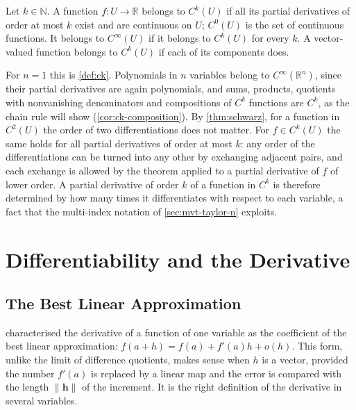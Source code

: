 \begin{definition}
\label{def:ck-rn}
Let $k\in\mathbb N$. A function $f\colon U\to\mathbb R$ belongs to $C^k(U)$ if all its partial derivatives of order at most $k$ exist and are continuous on $U$; $C^0(U)$ is the set of continuous functions. It belongs to $C^\infty(U)$ if it belongs to $C^k(U)$ for every $k$. A vector-valued function belongs to $C^k(U)$ if each of its components does.
\end{definition}

For $n=1$ this is \cref{def:ck}. Polynomials in $n$ variables belong to $C^\infty(\mathbb R^n)$, since their partial derivatives are again polynomials, and sums, products, quotients with nonvanishing denominators and compositions of $C^k$ functions are $C^k$, as the chain rule will show (\cref{cor:ck-composition}). By \cref{thm:schwarz}, for a function in $C^2(U)$ the order of two differentiations does not matter. For $f\in C^k(U)$ the same holds for all partial derivatives of order at most $k$: any order of the differentiations can be turned into any other by exchanging adjacent pairs, and each exchange is allowed by the theorem applied to a partial derivative of $f$ of lower order. A partial derivative of order $k$ of a function in $C^k$ is therefore determined by how many times it differentiates with respect to each variable, a fact that the multi-index notation of \cref{sec:mvt-taylor-n} exploits.

\section{Differentiability and the Derivative}
\label{sec:differentiability}

\subsection{The Best Linear Approximation}

 characterised the derivative of a function of one variable as the coefficient of the best linear approximation: $f(a+h)=f(a)+f'(a)h+o(h)$. This form, unlike the limit of difference quotients, makes sense when $h$ is a vector, provided the number $f'(a)$ is replaced by a linear map and the error is compared with the length $\|\mathbf h\|$ of the increment. It is the right definition of the derivative in several variables.

